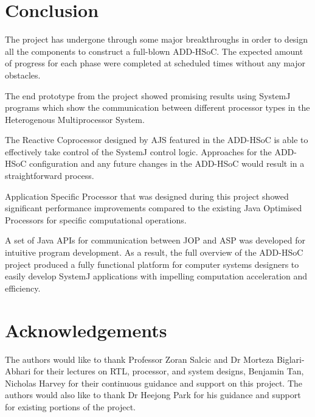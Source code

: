 \documentclass[]{article}
\begin{document}
	
	
	\section{Conclusion}
	The project has undergone through some major breakthroughs in order to design all the components to construct a full-blown ADD-HSoC. The expected amount of progress for each phase were completed at scheduled times without any major obstacles. \par
	
	The end prototype from the project showed promising results using SystemJ programs which show the communication between different processor types in the Heterogenous Multiprocessor System. \par
	
	The Reactive Coprocessor designed by AJS featured in the ADD-HSoC is able to effectively take control of the SystemJ control logic. Approaches for the ADD-HSoC configuration and any future changes in the ADD-HSoC would result in a straightforward process. \par
	
	Application Specific Processor that was designed during this project showed significant performance improvements compared to the existing Java Optimised Processors for specific computational operations.\par
	
	A set of Java APIs for communication between JOP and ASP was developed for intuitive program development. As a result, the full overview of the ADD-HSoC project produced a fully functional platform for computer systems designers to easily develop SystemJ applications with impelling computation acceleration and efficiency.
	
	
	
	\section{Acknowledgements}
	The authors would like to thank Professor Zoran Salcic and Dr Morteza Biglari-Abhari for their lectures on RTL, processor, and system designs, Benjamin Tan, Nicholas Harvey for their continuous guidance and support on this project. The authors would also like to thank Dr Heejong Park for his guidance and support for existing portions of the project.
	
	
	{}
	
	
	
	
\end{document}
